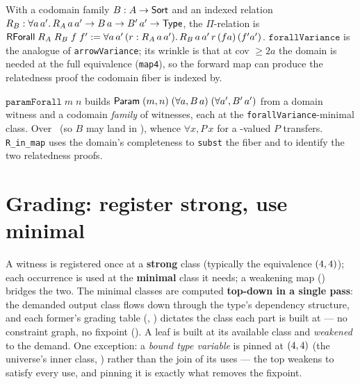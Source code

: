 \begin{definition}
  \label{def:forall-variance}
  \leanok
  With a codomain family $B : A \to \mathsf{Sort}$ and an indexed relation
  $R_B : \forall a\,a'.\,R_A\,a\,a' \to B\,a \to B'\,a' \to \mathsf{Type}$, the
  $\Pi$-relation is
  $\mathsf{RForall}\;R_A\;R_B\;f\;f' := \forall a\,a'\,(r : R_A\,a\,a').\,R_B\,a\,a'\,r\,(f a)\,(f' a')$.
  $\texttt{forallVariance}$ is the analogue of \texttt{arrowVariance}; its
  wrinkle is that at cov $\geq 2a$ the domain is needed at the full equivalence
  (\texttt{map4}), so the forward map can produce the relatedness proof the
  codomain fiber is indexed by.
\end{definition}

\begin{theorem}
  \label{thm:param-forall}
  \leanok
  $\texttt{paramForall}\;m\;n$ builds
  $\mathsf{Param}\;(m,n)\;(\forall a, B\,a)\;(\forall a', B'\,a')$ from a domain
  witness and a codomain \emph{family} of witnesses, each at the
  \texttt{forallVariance}-minimal class. Over \SortU\ (so $B$ may land in
  \PropSort), whence $\forall x, P\,x$ for a \PropSort-valued $P$ transfers.
  \texttt{R\_in\_map} uses the domain's completeness to \texttt{subst} the fiber
  and  to identify the two relatedness proofs.
\end{theorem}

\section{Grading: register strong, use minimal}
\label{sec:grading}

A witness is registered once at a \textbf{strong} class (typically the
equivalence $(4,4)$); each occurrence is used at the \textbf{minimal} class
it needs; a weakening map () bridges the two. The minimal
classes are computed \textbf{top-down in a single pass}: the demanded output
class flows down through the type's dependency structure, and each former's
grading table (, ) dictates
the class each part is built at --- no constraint graph, no fixpoint
(). A leaf is built at its available class and \emph{weakened}
to the demand. One exception: a \emph{bound type variable} is pinned at
$(4,4)$ (the universe's inner class, ) rather than the
join of its uses --- the top weakens to satisfy every use, and pinning it is
exactly what removes the fixpoint.

